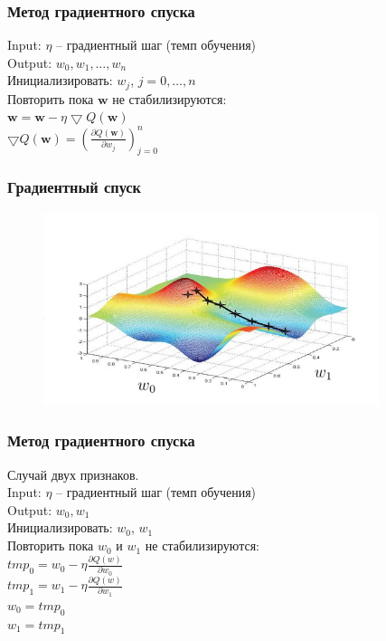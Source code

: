 \documentclass[12pt]{beamer}
\begin{document}
\begin{frame}\frametitle{Метод градиентного спуска}
Input: $\eta$ -- градиентный шаг (темп обучения)\\
Output: $w_0, w_1, \dots, w_n$\\
\vspace{3mm}	
Инициализировать: $w_j$, $j=0,\dots, n$\\
Повторить пока $\mathbf{w}$ не стабилизируются:\\
\hspace{10mm} $\mathbf{w} =  \mathbf{w} - \eta \bigtriangledown Q(\mathbf{w})$\\

\vspace{10mm}
$\bigtriangledown Q(\mathbf{w}) = (\frac{\partial Q(\mathbf{w})}{\partial w_j})_{j=0}^n$\\
\end{frame}

\begin{frame}\frametitle{Градиентный спуск}
\begin{figure}[htbp]
  \includegraphics[height=160pt, keepaspectratio = true]{images/gradient_descent}   
\end{figure}
\end{frame}

\begin{frame}\frametitle{Метод градиентного спуска}
Случай двух признаков.\\
Input: $\eta$ -- градиентный шаг (темп обучения)\\
Output: $w_0, w_1$\\
\vspace{3mm}	
Инициализировать: $w_0$, $w_1$\\
Повторить пока $w_0$ и $w_1$ не стабилизируются:\\
\hspace{10mm} $tmp_0 =  w_0 - \eta \frac{\partial Q(w)}{\partial w_0}$\\
\hspace{10mm} $tmp_1 =  w_1 - \eta \frac{\partial Q(w)}{\partial w_1}$\\
\hspace{10mm} $w_0 = tmp_0$\\
\hspace{10mm} $w_1 = tmp_1$
\end{frame}
\end{document}
